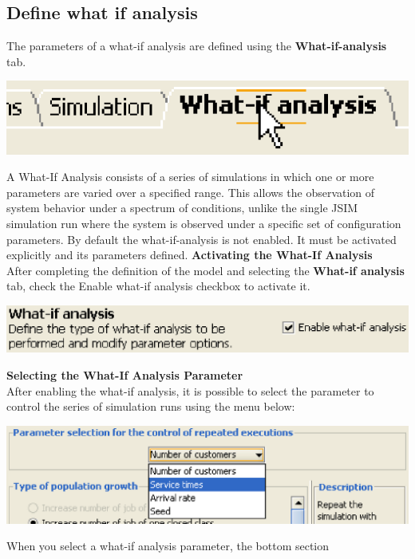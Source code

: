 \begin{description*}
\subsection{Define what if analysis}
\label{sec:DefineWhatIfAnalysis}
The parameters of a what-if analysis are defined using the \textbf{What-if-analysis} tab.
\begin{center}
\includegraphics[scale=.5]{img/jsim/whatif_tab.eps}
\end{center}
A What-If Analysis consists of a series of simulations in which one or more parameters are varied over a specified range. This allows the observation of system behavior under a spectrum of conditions, unlike the single JSIM simulation run where the system is observed under a specific set of configuration parameters.
By default the what-if-analysis is not enabled. It must be activated explicitly and its parameters defined.
\textbf{Activating the What-If Analysis }\\
After completing the definition of the model and selecting the \textbf{What-if analysis} tab, check the Enable what-if analysis checkbox to activate it.
\begin{center}
\includegraphics[scale=.5]{img/jsim/enable_box.eps}
\end{center}
\textbf{Selecting the What-If Analysis Parameter}\\
After enabling the what-if analysis, it is possible to select the parameter to control the series of simulation runs using the menu below:
\begin{center}
\includegraphics[scale=.5]{img/jsim/type_selection.eps}
\end{center}
When you select a what-if analysis parameter, the bottom section

\end{description*}
